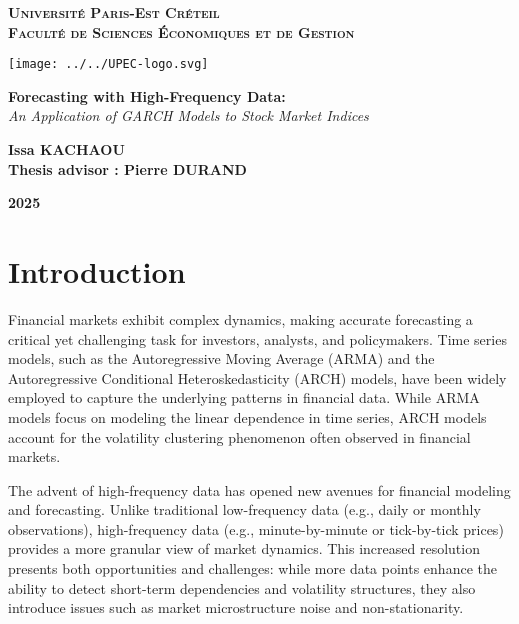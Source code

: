 \documentclass[a4paper, 12pt]{article}
\begin{document}
	\begin{titlepage}
		\centering
		\vspace*{0.5cm}
\textsc{{\LARGE \textbf{Université Paris-Est Créteil}}} \\
\vspace*{0.5cm}
\textsc{{\LARGE \textbf{Faculté de Sciences Économiques et de Gestion}}}
\vspace*{2cm}

		\begin{center}
\texttt{[image: ../../UPEC-logo.svg]}
		\end{center}
		\vspace*{2cm}
		
		\LARGE
		
		\textbf{Forecasting with High-Frequency Data:}\\
			\textit{An Application of GARCH Models to Stock Market Indices}\\
		\vspace{1cm}		
		\Large

		\vspace{1cm}
		
		\textbf{Issa KACHAOU}\\
		\large
		\textbf{Thesis advisor : Pierre DURAND} \\
		
		
		
		\vfill
		
		\Large

		\textbf{2025}
		
	\end{titlepage}

\pagestyle{plain}
\part{Introduction}

Financial markets exhibit complex dynamics, making accurate forecasting a critical yet challenging task for investors, analysts, and policymakers. Time series models, such as the Autoregressive Moving Average (ARMA) and the Autoregressive Conditional Heteroskedasticity (ARCH) models, have been widely employed to capture the underlying patterns in financial data. While ARMA models focus on modeling the linear dependence in time series, ARCH models account for the volatility clustering phenomenon often observed in financial markets.

The advent of high-frequency data has opened new avenues for financial modeling and forecasting. Unlike traditional low-frequency data (e.g., daily or monthly observations), high-frequency data (e.g., minute-by-minute or tick-by-tick prices) provides a more granular view of market dynamics. This increased resolution presents both opportunities and challenges: while more data points enhance the ability to detect short-term dependencies and volatility structures, they also introduce issues such as market microstructure noise and non-stationarity.
\end{document}
